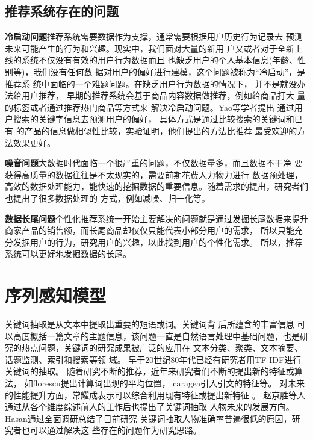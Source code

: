 \subsection{推荐系统存在的问题}

\textbf{冷启动问题}推荐系统需要数据作为支撑，通常需要根据用户历史行为记录去%
预测未来可能产生的行为和兴趣。现实中，我们面对大量的新用%
户又或者对于全新上线的系统不仅没有有效的用户行为数据而且%
也缺乏用户的个人基本信息(年龄、性别等)，我们没有任何数%
据对用户的偏好进行建模，这个问题被称为“冷启动”，是推荐系%
统中面临的一个难题问题。在缺乏用户行为数据的情况下，%
并不是就没办法给用户推荐，
早期的推荐系统会基于商品内容数据做推荐，例如给商品打大%
量的标签或者通过推荐热门商品等方式来%
解决冷启动问题。Yao等学者提出%
通过用户搜索的关键字信息去预测用户的偏好，%
具体方式是通过比较搜索的关键词和已有%
的产品的信息做相似性比较，实验证明，他们提出的方法比推荐%
最受欢迎的方法效果更好。

\textbf{噪音问题}大数据时代面临一个很严重的问题，不仅数据量多，而且数据不干净%
要获得高质量的数据往往是不太现实的，需要前期花费人力物力进行%
数据预处理，高效的数据处理能力，能快速的挖掘数据的重要信息。随着需求的提出，研究者们也提出了很多数据处理的%
方式，例如减噪、归一化等。

\textbf{数据长尾问题}个性化推荐系统一开始主要解决的问题就是通过发掘长尾数据来提升%
商家产品的销售额，而长尾商品却仅仅只能代表小部分用户的需求，%
所以只能充分发掘用户的行为，研究用户的兴趣，以此找到用户的个性化需求。%
所以，推荐系统可以更好地发掘数据的长尾。
\section{序列感知模型}
关键词抽取是从文本中提取出重要的短语或词。关键词背%
后所蕴含的丰富信息%
可以高度概括一篇文章的主题信息，该问题一直是自然语言处理中基础问题，也是研究的热点问题，关键词的研究成果被广泛的应用在%
文本分类、聚类、文本摘要、话题监测、索引和搜索等领%
域。%
早于20世纪80年代已经有研究者用TF-IDF进行关键词的抽取。%
随着研究不断的推荐，近年来研究者们不断的提出新的特征或算法，%
如florescu提出计算词出现的平均位置，%
caragea引入引文的特征等。%
对未来的性能提升方面，常耀成表示可以综合利用现有特征或提出新特征%
。%
赵京胜等人通过从各个维度综述前人的工作后也提出了关键词抽取%
人物未来的发展方向。%
Hasan通过全面调研总结了目前研究%
关键词抽取人物准确率普遍很低的原因，研究者也可以通过解决这%
些存在的问题作为研究思路。%


